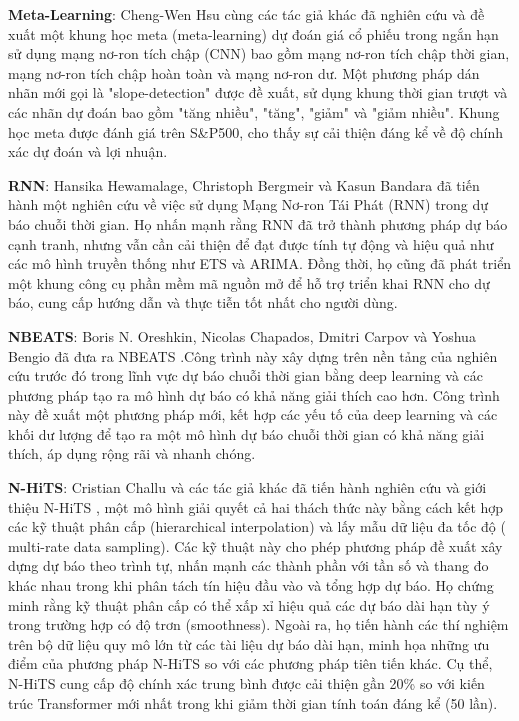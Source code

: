 \textbf{Meta-Learning}: Cheng-Wen Hsu cùng các tác giả khác \cite{b5} đã nghiên cứu và đề xuất một khung học meta (meta-learning) dự đoán giá cổ phiếu trong ngắn hạn sử dụng mạng nơ-ron tích chập (CNN) bao gồm mạng nơ-ron tích chập thời gian, mạng nơ-ron tích chập hoàn toàn và mạng nơ-ron dư. Một phương pháp dán nhãn mới gọi là "slope-detection" được đề xuất, sử dụng khung thời gian trượt và các nhãn dự đoán bao gồm "tăng nhiều", "tăng", "giảm" và "giảm nhiều". Khung học meta được đánh giá trên S\&P500, cho thấy sự cải thiện đáng kể về độ chính xác dự đoán và lợi nhuận.
\par
\textbf{RNN}: 
Hansika Hewamalage, Christoph Bergmeir và Kasun Bandara đã tiến hành một nghiên cứu về việc sử dụng Mạng Nơ-ron Tái Phát (RNN) \cite{b6} trong dự báo chuỗi thời gian. Họ nhấn mạnh rằng RNN đã trở thành phương pháp dự báo cạnh tranh, nhưng vẫn cần cải thiện để đạt được tính tự động và hiệu quả như các mô hình truyền thống như ETS và ARIMA. Đồng thời, họ cũng đã phát triển một khung công cụ phần mềm mã nguồn mở để hỗ trợ triển khai RNN cho dự báo, cung cấp hướng dẫn và thực tiễn tốt nhất cho người dùng.
\par
\textbf{NBEATS}: Boris N. Oreshkin, Nicolas Chapados, Dmitri Carpov và Yoshua Bengio đã đưa ra NBEATS \cite{b7}.Công trình này xây dựng trên nền tảng của nghiên cứu trước đó trong lĩnh vực dự báo chuỗi thời gian bằng deep learning và các phương pháp tạo ra mô hình dự báo có khả năng giải thích cao hơn. Công trình này đề xuất một phương pháp mới, kết hợp các yếu tố của deep learning và các khối dư lượng để tạo ra một mô hình dự báo chuỗi thời gian có khả năng giải thích, áp dụng rộng rãi và nhanh chóng.
\par
\textbf{N-HiTS}: Cristian Challu và các tác giả khác đã tiến hành nghiên cứu và giới thiệu N-HiTS \cite{b8}, một mô hình giải quyết cả hai thách thức này bằng cách kết hợp các kỹ thuật phân cấp (hierarchical interpolation) và lấy mẫu dữ liệu đa tốc độ ( multi-rate data sampling). Các kỹ thuật này cho phép phương pháp đề xuất xây dựng dự báo theo trình tự, nhấn mạnh các thành phần với tần số và thang đo khác nhau trong khi phân tách tín hiệu đầu vào và tổng hợp dự báo. Họ chứng minh rằng kỹ thuật phân cấp có thể xấp xỉ hiệu quả các dự báo dài hạn tùy ý trong trường hợp có độ trơn (smoothness). Ngoài ra, họ tiến hành các thí nghiệm trên bộ dữ liệu quy mô lớn từ các tài liệu dự báo dài hạn, minh họa những ưu điểm của phương pháp N-HiTS so với các phương pháp tiên tiến khác. Cụ thể, N-HiTS cung cấp độ chính xác trung bình được cải thiện gần 20\% so với kiến trúc Transformer mới nhất trong khi giảm thời gian tính toán đáng kể (50 lần).